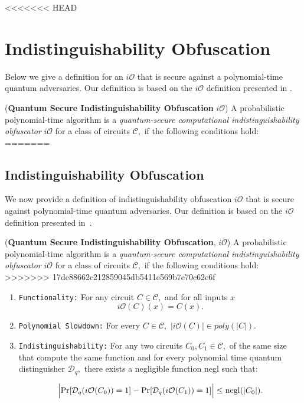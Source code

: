 <<<<<<< HEAD
\section*{Indistinguishability Obfuscation}
Below we give a definition for an $i\mathcal{O}$ that is secure against a polynomial-time quantum adversaries. Our definition is based on the $i\mathcal{O}$ definition presented in \cite{GR14}.
\begin{definition}\label{def:qiO} {\rm({\bf Quantum Secure Indistinguishability Obfuscation} $i\mathcal{O}$)}
A probabilistic polynomial-time algorithm is a \emph{quantum-secure computational indistinguishability obfuscator} $i\mathcal{O}$ for a class of circuits ${\mathcal C},$ if the following conditions hold: 
=======
\subsection{Indistinguishability Obfuscation}
We now provide a definition of indistinguishability obfuscation $i\mathcal{O}$ that is secure against polynomial-time quantum adversaries. Our definition is based on the $i\mathcal{O}$ definition presented in~\cite{GR14}.
\begin{definition}\label{def:qiO} {\rm({\bf Quantum Secure Indistinguishability Obfuscation}, $i\mathcal{O}$)}
A probabilistic polynomial-time algorithm is a \emph{quantum-secure computational indistinguishability obfuscator} $i\mathcal{O}$ for a class of circuits ${\mathcal C},$ if the following conditions hold:
>>>>>>> 17de88662c212859045db5411e569b7e70c62e6f

\begin{enumerate}
\item {\tt Functionality:} For any circuit $C\in {\mathcal C},$ and for all inputs $x$ $$i\mathcal{O}(C)(x)=C(x).$$
\item  {\tt Polynomial Slowdown:}  For every $C\in \mathcal{C},$  $|i\mathcal{O}(C)| \in poly(|C|).$
\item {\tt Indistinguishability:} For any two circuits $C_0,C_1\in {\mathcal C},$ of the same size  that compute the same function
 and for every polynomial time quantum distinguisher $\mathcal{D}_q,$  there exists a negligible function {\rm negl} such that:

					$$\Big | {\rm Pr}[\mathcal{D}_q(i\mathcal{O}(C_0))=1]-{\rm Pr}[\mathcal{D}_q(i\mathcal{O}(C_1))=1] \Big |\leq  {\rm negl}(|C_0|).$$			
\end{enumerate}										
\end{definition}




\end{definition}
